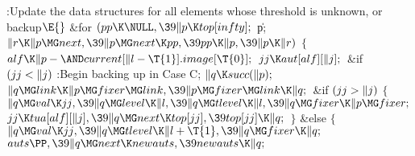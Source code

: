 \B{}:Update the data structures for all elements whose threshold is
unknown, or backup\X${}\E{}$\6
\&{for} ${}(\\{pp}\K\NULL,\39\|p\K\\{top}[\\{infty}];{}$ \|p; ${}\|r\K\|p\MG%
\\{next},\39\|p\MG\\{next}\K\\{pp},\39\\{pp}\K\|p,\39\|p\K\|r){}$\5
${}\{{}$\1\6
${}\\{alf}\K\|p-{\AND}\\{current}[\|l-\T{1}].\\{image}[\T{0}];{}$\6
${}\\{jj}\K\\{aut}[\\{alf}][\|j];{}$\6
\&{if} ${}(\\{jj}<\|j){}$\1\5
:Begin backing up in Case C\X;\2\6
${}\|q\K\\{succ}(\|p);{}$\6
${}\|q\MG\\{link}\K\|p\MG\\{fixer}\MG\\{link},\39\|p\MG\\{fixer}\MG\\{link}\K%
\|q;{}$\6
\&{if} ${}(\\{jj}>\|j){}$\5
${}\{{}$\1\6
${}\|q\MG\\{val}\K\\{jj},\39\|q\MG\\{level}\K\|l,\39\|q\MG\\{tlevel}\K\|l,\39%
\|q\MG\\{fixer}\K\|p\MG\\{fixer};{}$\6
${}\\{jj}\K\\{tua}[\\{alf}][\|j],\39\|q\MG\\{next}\K\\{top}[\\{jj}],\39\\{top}[%
\\{jj}]\K\|q;{}$\6
\4${}\}{}$\5
\2\&{else}\5
${}\{{}$\1\6
${}\|q\MG\\{val}\K\\{jj},\39\|q\MG\\{tlevel}\K\|l+\T{1},\39\|q\MG\\{fixer}\K%
\|q;{}$\6
${}\\{auts}\PP,\39\|q\MG\\{next}\K\\{newauts},\39\\{newauts}\K\|q;{}$\6
